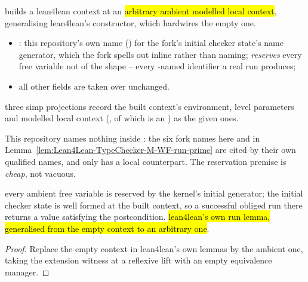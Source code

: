 \begin{definition}
\label{def:Lean4Lean-TypeChecker-VContext-ofMLCtx}
\leanok
{}  builds a lean4lean context at an \hl{arbitrary ambient
modelled local context}, generalising lean4lean's constructor, which hardwires the empty one.
\begin{itemize}
\item {}: this repository's own name () for the fork's
initial checker state's name generator, which the fork spells out inline rather than naming;
\emph{reserves} every free variable not of the shape  -- every
-named identifier a real run produces;
\item all other fields are taken over unchanged.
\end{itemize}
 three simp projections record the built context's environment, level parameters and
modelled local context (, of which  is an ) as the given
ones.
\end{definition}

\begin{remark}
 This repository names nothing inside : the
six fork names here and in Lemma~\ref{lem:Lean4Lean-TypeChecker-M-WF-run-prime} are cited by their
own qualified names, and only  has a local counterpart. The reservation premise
is \emph{cheap}, not vacuous.
\end{remark}

\begin{lemma}
\label{lem:Lean4Lean-TypeChecker-M-WF-run-prime}
\leanok
{} every ambient free variable is reserved by the kernel's initial generator;
 the initial checker state is well formed at the built context, so a successful obliged
run there returns a value satisfying the postcondition.
 \hl{lean4lean's own run lemma, generalised from the empty context to an arbitrary
one}.
\end{lemma}
\begin{proof}
\leanok
{}
 Replace the empty context in lean4lean's own lemmas by the ambient one, taking the
extension witness at a reflexive lift with an empty equivalence manager.
\end{proof}

